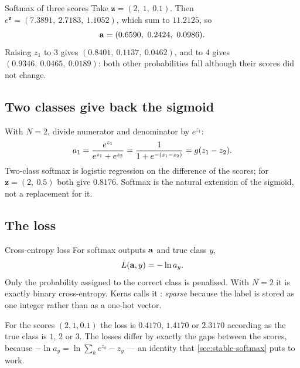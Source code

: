 \begin{workedexample}{Softmax of three scores}
Take $\mathbf{z} = (2,\ 1,\ 0.1)$. Then $e^{\mathbf{z}} = (7.3891,\ 2.7183,\
1.1052)$, which sum to $11.2125$, so
\[
  \va = (0.6590,\ 0.2424,\ 0.0986).
\]
Raising $z_1$ to $3$ gives $(0.8401,\ 0.1137,\ 0.0462)$, and to $4$ gives
$(0.9346,\ 0.0465,\ 0.0189)$: both other probabilities fall although their
scores did not change.
\end{workedexample}

\subsection{Two classes give back the sigmoid}

With $N = 2$, divide numerator and denominator by $e^{z_1}$:
\[
  a_1 = \frac{e^{z_1}}{e^{z_1} + e^{z_2}} = \frac{1}{1 + e^{-(z_1 - z_2)}}
      = g(z_1 - z_2).
\]
Two-class softmax is logistic regression on the difference of the scores; for
$\mathbf{z} = (2,\ 0.5)$ both give $0.8176$. Softmax is the natural extension of
the sigmoid, not a replacement for it.

\subsection{The loss}

\begin{defbox}{Cross-entropy loss}
For softmax outputs $\mathbf{a}$ and true class $y$,
\[
  L(\mathbf{a}, y) = -\ln a_y .
\]
Only the probability assigned to the correct class is penalised. With $N = 2$ it
is exactly binary cross-entropy. Keras calls it
: \emph{sparse} because the label is stored as
one integer rather than as a one-hot vector.
\end{defbox}

For the scores $(2, 1, 0.1)$ the loss is $0.4170$, $1.4170$ or $2.3170$
according as the true class is $1$, $2$ or $3$. The losses differ by exactly the
gaps between the scores, because
$-\ln a_y = \ln\sum_k e^{z_k} - z_y$ --- an identity that \cref{sec:stable-softmax}
puts to work.

